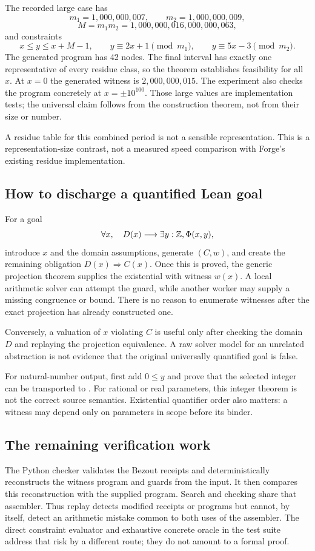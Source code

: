 \begin{example}
The recorded large case has
\[
 m_1=1{,}000{,}000{,}007,\qquad m_2=1{,}000{,}000{,}009,
\]
\[
 M=m_1m_2=1{,}000{,}000{,}016{,}000{,}000{,}063,
\]
and constraints
\[
 x\le y\le x+M-1,\qquad
 y\equiv2x+1\pmod{m_1},\qquad
 y\equiv5x-3\pmod{m_2}.
\]
The generated program has 42 nodes. The final interval has exactly one
representative of every residue class, so the theorem establishes feasibility
for all $x$. At $x=0$ the generated witness is $2{,}000{,}000{,}015$. The
experiment also checks the program concretely at $x=\pm10^{100}$. Those large
values are implementation tests; the universal claim follows from the
construction theorem, not from their size or number.
\end{example}

A residue table for this combined period is not a sensible representation.
This is a representation-size contrast, not a measured speed comparison with
Forge's existing residue implementation.

\subsection{How to discharge a quantified Lean goal}
For a goal
\[
 \forall x,\quad D(x)\longrightarrow\exists y:\mathbb{Z},\Phi(x,y),
\]
introduce $x$ and the domain assumptions, generate $(C,w)$, and create the
remaining obligation $D(x)\Rightarrow C(x)$. Once this is proved, the generic
projection theorem supplies the existential with witness $w(x)$. A local
arithmetic solver can attempt the guard, while another worker may supply a
missing congruence or bound. There is no reason to enumerate witnesses after
the exact projection has already constructed one.

Conversely, a valuation of $x$ violating $C$ is useful only after checking the
domain $D$ and replaying the projection equivalence. A raw solver model for an
unrelated abstraction is not evidence that the original universally quantified
goal is false.

For natural-number output, first add $0\le y$ and prove that the selected
integer can be transported to . For rational or real parameters,
this integer theorem is not the correct source semantics. Existential
quantifier order also matters: a witness may depend only on parameters in
scope before its binder.

\subsection{The remaining verification work}
The Python checker validates the Bezout receipts and deterministically
reconstructs the witness program and guards from the input. It then compares
this reconstruction with the supplied program. Search and checking share that
assembler. Thus replay detects modified receipts or programs but cannot,
by itself, detect an arithmetic mistake common to both uses of the assembler.
The direct constraint evaluator and exhaustive concrete oracle in the test suite
address that risk by a different route; they do not amount to a formal proof.

